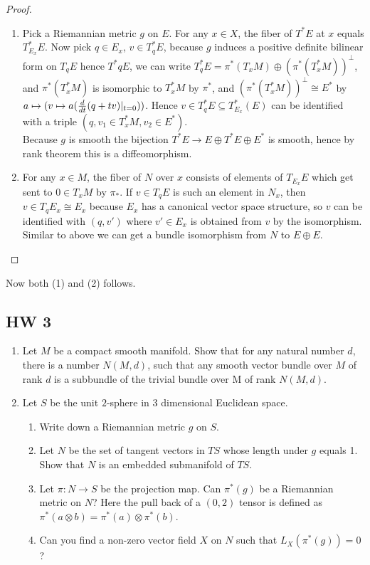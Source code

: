 \documentclass{article}
\theoremstyle{definition}
\begin{document}
\begin{proof}
    \begin{enumerate}
        \item Pick a Riemannian metric $g$ on $E$. For any $x\in X$, the fiber of $T^*E$ at $x$ equals $T^*_{E_x}E$. Now pick $q\in E_x$, $v\in T^*_qE$, because $g$ induces a positive definite bilinear form on $T_qE$ hence $T^*qE$, we can write $T^*_qE=\pi^*(T_xM)\oplus (\pi^*(T^*_xM))^\perp$, and $\pi^*(T^*_xM)$ is isomorphic to $T^*_xM$ by $\pi^*$, and $(\pi^*(T^*_xM))^\perp\cong E^*$ by $a\mapsto (v\mapsto a({d\over dt}(q+tv)|_{t=0}))$. Hence $v\in T^*_qE\subseteq T^*_{E_x}(E)$ can be identified with a triple $(q, v_1\in T^*_xM, v_2\in E^*)$.\\

        Because $g$ is smooth the bijection $T^*E\rightarrow E\oplus T^*E\oplus E^*$ is smooth, hence by rank theorem this is a diffeomorphism. 

        \item For any $x\in M$, the fiber of $N$ over $x$ consists of elements of $T_{E_x}E$ which get sent to $0\in T_xM$ by $\pi_*$. If $v\in T_qE$ is such an element in $N_x$, then $v\in T_qE_x\cong E_x$ because $E_x$ has a canonical vector space structure, so $v$ can be identified with $(q, v')$ where $v'\in E_x$ is obtained from $v$ by the isomorphism. Similar to above we can get a bundle isomorphism from $N$ to $E\oplus E$.  
        \end{enumerate}
\end{proof}


Now both (1) and (2) follows.

\newpage
\subsection{HW 3}

\begin{enumerate}
    \item Let $M$ be a compact smooth manifold. Show that for any natural number $d$, there is a number $N(M, d)$, such that any smooth vector bundle over $M$ of rank $d$ is a subbundle of the trivial bundle over M of rank $N(M, d)$.
    \item Let $S$ be the unit $2$-sphere in 3 dimensional Euclidean space.
    \begin{enumerate}[(1)]
        \item Write down a Riemannian metric $g$ on $S$.
        \item Let $N$ be the set of tangent vectors in $TS$ whose length under $g$ equals 1. Show that $N$ is an embedded submanifold of $TS$.
        \item Let $\pi: N\rightarrow S$ be the projection map. Can $\pi^*(g)$ be a Riemannian metric on $N$? Here the pull back of a $(0, 2)$ tensor is defined as $\pi^*(a\otimes b)=\pi^*(a)\otimes \pi^*(b)$.
        \item Can you find a non-zero vector field $X$ on $N$ such that $L_X(\pi^*(g))=0$?
    \end{enumerate}
\end{enumerate}
\end{document}
